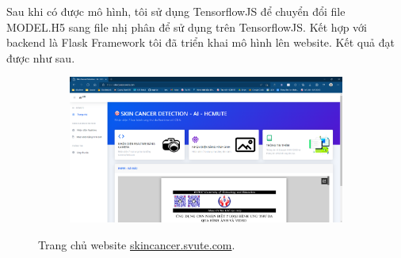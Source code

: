 \documentclass[12pt,a4paper]{article}
\begin{document}
	Sau khi có được mô hình, tôi sử dụng TensorflowJS để chuyển đổi file MODEL.H5 sang file nhị phân để sử dụng trên TensorflowJS. Kết hợp với backend là Flask Framework tôi đã triển khai mô hình lên website. Kết quả đạt được như sau.\\
		
	\begin{figure}[h!]
		\centering
		\begin{subfigure}[b]{0.8\linewidth}
			\includegraphics[width=\linewidth]{./images/web3.png}
		\end{subfigure}
		\caption{Trang chủ website \href{https://skincancer.svute.com}{skincancer.svute.com}.}
		\label{fig:web1}
	\end{figure}
	
\end{document}
